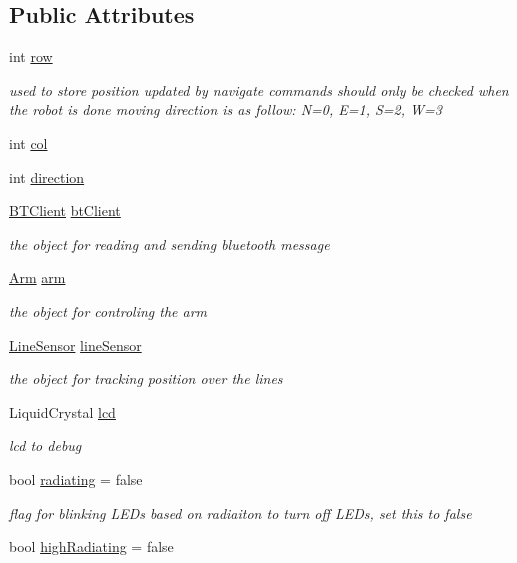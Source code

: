 \subsection*{Public Attributes}
\begin{DoxyCompactItemize}
\item 
int \hyperlink{classRobot_a35ce5c416a079fcf6b943843ec151d63}{row}
\begin{DoxyCompactList}\small\item\em used to store position updated by navigate commands should only be checked when the robot is done moving direction is as follow\-: N=0, E=1, S=2, W=3 \end{DoxyCompactList}\item 
int \hyperlink{classRobot_a2e08d53491bb82defe2e28ee9ce1d096}{col}
\item 
int \hyperlink{classRobot_ac25b4dfc2e9e5aa86ec5684d075d32b8}{direction}
\item 
\hyperlink{classBTClient}{B\-T\-Client} \hyperlink{classRobot_a9da91e6d551ed02038e935b3c755cc75}{bt\-Client}
\begin{DoxyCompactList}\small\item\em the object for reading and sending bluetooth message \end{DoxyCompactList}\item 
\hyperlink{classArm}{Arm} \hyperlink{classRobot_a444673862cbe384992aceb066282b500}{arm}
\begin{DoxyCompactList}\small\item\em the object for controling the arm \end{DoxyCompactList}\item 
\hyperlink{classLineSensor}{Line\-Sensor} \hyperlink{classRobot_abdc300045bea9a31013b25682629752d}{line\-Sensor}
\begin{DoxyCompactList}\small\item\em the object for tracking position over the lines \end{DoxyCompactList}\item 
Liquid\-Crystal \hyperlink{classRobot_aa2182958e636a5b3e0383643a48ca6f8}{lcd}
\begin{DoxyCompactList}\small\item\em lcd to debug \end{DoxyCompactList}\item 
bool \hyperlink{classRobot_a77f62d85ab1cf34e79c2a3acd470a4ce}{radiating} = false
\begin{DoxyCompactList}\small\item\em flag for blinking L\-E\-Ds based on radiaiton to turn off L\-E\-Ds, set this to false \end{DoxyCompactList}\item 
bool \hyperlink{classRobot_a52d4eac720f8d9afe84ebb5f4ea4a82e}{high\-Radiating} = false
\end{DoxyCompactItemize}
